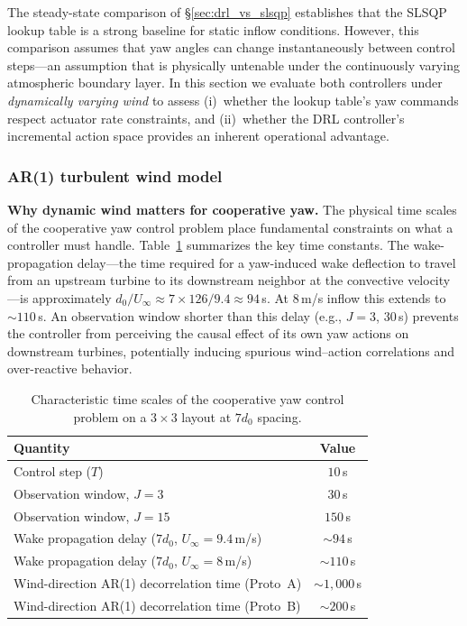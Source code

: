 \documentclass[final,5p,times]{elsarticle}
\begin{document}
The steady-state comparison of \S\ref{sec:drl_vs_slsqp} establishes that the SLSQP lookup table is a strong baseline for static inflow conditions. However, this comparison assumes that yaw angles can change instantaneously between control steps---an assumption that is physically untenable under the continuously varying atmospheric boundary layer. In this section we evaluate both controllers under \emph{dynamically varying wind} to assess (i)~whether the lookup table's yaw commands respect actuator rate constraints, and (ii)~whether the DRL controller's incremental action space provides an inherent operational advantage.

\subsubsection{AR(1) turbulent wind model}\label{sec:ar1_wind}
\textbf{Why dynamic wind matters for cooperative yaw.} The physical time scales of the cooperative yaw control problem place fundamental constraints on what a controller must handle. Table~\ref{tab:timescales} summarizes the key time constants. The wake-propagation delay---the time required for a yaw-induced wake deflection to travel from an upstream turbine to its downstream neighbor at the convective velocity---is approximately $d_0/U_\infty \approx 7{\times}126/9.4 \approx 94$\,s. At $8$\,m/s inflow this extends to ${\sim}110$\,s. An observation window shorter than this delay (e.g., $J{=}3$, $30$\,s) prevents the controller from perceiving the causal effect of its own yaw actions on downstream turbines, potentially inducing spurious wind--action correlations and over-reactive behavior.

\begin{table}[h]
\centering
\caption{Characteristic time scales of the cooperative yaw control problem on a $3{\times}3$ layout at $7d_0$ spacing.}
\label{tab:timescales}
\small
\begin{tabular}{lc}
\toprule
Quantity & Value \\
\midrule
Control step ($T$) & $10$\,s \\
Observation window, $J{=}3$ & $30$\,s \\
Observation window, $J{=}15$ & $150$\,s \\
Wake propagation delay ($7d_0$, $U_\infty{=}9.4$\,m/s) & ${\sim}94$\,s \\
Wake propagation delay ($7d_0$, $U_\infty{=}8$\,m/s) & ${\sim}110$\,s \\
Wind-direction AR(1) decorrelation time (Proto~A) & ${\sim}1{,}000$\,s \\
Wind-direction AR(1) decorrelation time (Proto~B) & ${\sim}200$\,s \\
\bottomrule
\end{tabular}
\end{table}
\end{document}
